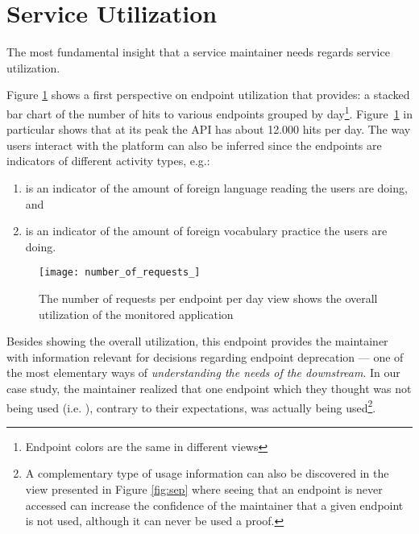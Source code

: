 
\section{Service Utilization}
\label{sec:util}

  The most fundamental insight that a service maintainer needs regards service utilization. %

  Figure \ref{fig:aeu} shows a first perspective on endpoint utilization that \tool provides: a stacked bar chart of the number of hits to various endpoints grouped by day\footnote{Endpoint colors are the same in different views}. Figure~\ref{fig:aeu} in particular shows that at its peak the API has about 12.000 hits per day. 
  The way users interact with the platform can also be inferred since the endpoints are indicators of different activity types, e.g.: 

  \begin{enumerate}

    \item {\color{myred} \epTranslations} is an indicator of the amount of foreign language reading the users are doing, and 

    \item {\color{mygreen} \epOutcome} is an indicator of the amount of foreign vocabulary practice the users are doing.

  \end{enumerate}


  \begin{figure}[!ht]
    \centering
    \texttt{[image: number\_of\_requests\_]}
    \caption{The number of requests per endpoint per day view shows the overall utilization of the monitored application}
    \label{fig:aeu}
  \end{figure}

  Besides showing the overall utilization, this endpoint provides the maintainer with information relevant for decisions regarding endpoint deprecation --- one of the most elementary ways of {\em understanding the needs of the downstream}\cite{Haen14a}. In our case study, the maintainer realized that one endpoint which they thought was not being used (i.e. ), contrary to their expectations, was actually being used\footnote{A complementary type of usage information can also be discovered in the view presented in Figure \ref{fig:sep} where seeing that an endpoint is never accessed can increase the confidence of the maintainer that a given endpoint is not used, although it can never be used a proof.}.

